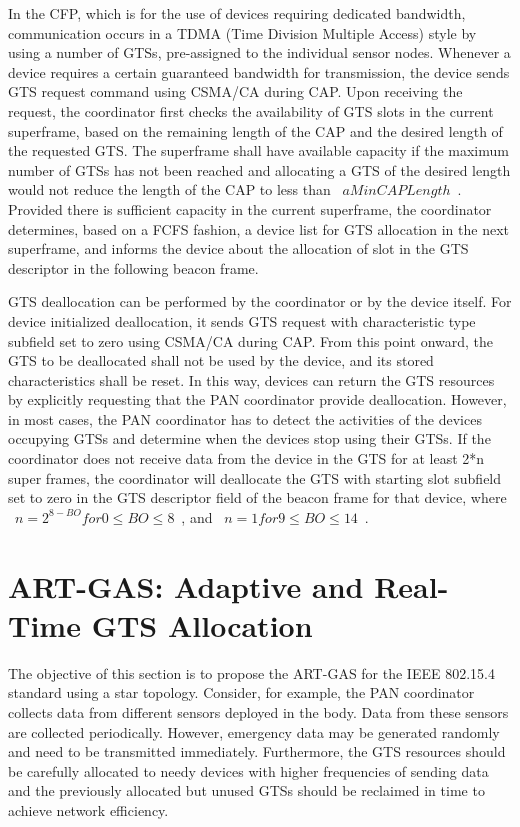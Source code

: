 \documentclass[letterpaper]{sig-alternate-10pt}
\begin{document}
In the CFP, which is for the use of devices requiring dedicated bandwidth, communication occurs in a TDMA (Time Division Multiple Access) style by using a number of GTSs, pre-assigned to the individual sensor nodes. Whenever a device requires a certain guaranteed bandwidth for transmission, the device sends GTS request command using CSMA/CA during CAP. Upon receiving the request, the coordinator first checks the availability of GTS slots in the current superframe, based on the remaining length of the CAP and the desired length of the requested GTS. The superframe shall have available capacity if the maximum number of GTSs has not been reached and allocating a GTS of the desired length would not reduce the length of the CAP to less than ~$aMinCAPLength$~. Provided there is sufficient capacity in the current superframe, the coordinator determines, based on a FCFS fashion, a device list for GTS allocation in the next superframe, and informs the device about the allocation of slot in the GTS descriptor in the following beacon frame.

GTS deallocation can be performed by the coordinator or by the device itself. For device initialized deallocation, it sends GTS request with characteristic type subfield set to zero using CSMA/CA during CAP. From this point onward, the GTS to be deallocated shall not be used by the device, and its stored characteristics shall be reset. In this way, devices can return the GTS resources by explicitly requesting that the PAN coordinator provide deallocation. However, in most cases, the PAN coordinator has to detect the activities of the devices occupying GTSs and determine when the devices stop using their GTSs. If the coordinator does not receive data from the device in the GTS for at least 2*n super frames, the coordinator will deallocate the GTS with starting slot subfield set to zero in the GTS descriptor field of the beacon frame for that device, where ~$n = 2^{8-BO} for 0 \le BO \le 8$~, and ~$n = 1 for 9 \le BO \le 14$~.


\section{ART-GAS: Adaptive and Real-Time GTS Allocation}
The objective of this section is to propose the ART-GAS for the IEEE 802.15.4 standard using a star topology. Consider, for example, the PAN coordinator collects data from different sensors deployed in the body. Data from these sensors are collected periodically. However, emergency data may be generated randomly and need to be transmitted immediately. Furthermore, the GTS resources should be carefully allocated to needy devices with higher frequencies of sending data and the previously allocated but unused GTSs should be reclaimed in time to achieve network efficiency.
\end{document}
